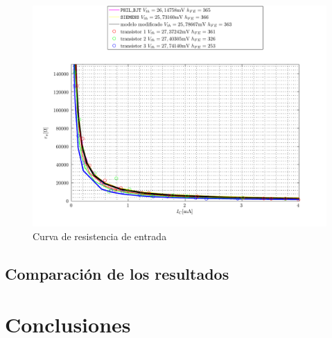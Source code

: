 \documentclass[10pt,spanish,a4paper,openany,notitlepage]{article}
\begin{document}
\begin{figure}[H] %
\begin{center}
\includegraphics[scale=0.7]{./Octave/rpi.pdf}
\caption{Curva de resistencia de entrada}
 \label{fig:rpi}
\end{center}
\end{figure}

\subsection{Comparación de los resultados}

\section{Conclusiones}
\end{document}
